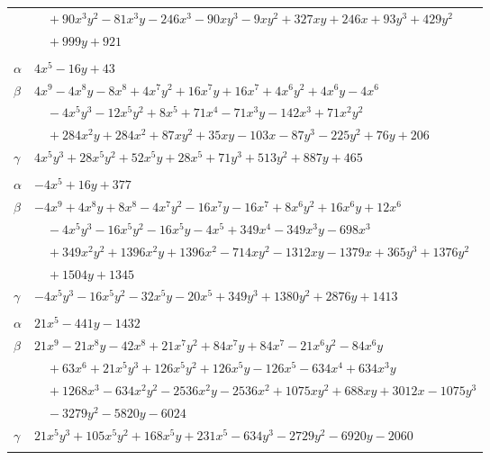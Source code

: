 \documentclass[11pt]{article}
\begin{document}
\begin{longtable}{@{}ll@{}}
 & $\quad +90x^{3}y^{2}-81x^{3}y-246x^{3}-90xy^{3}-9xy^{2}+327xy+246x+93y^{3}+429y^{2}$\\
 & $\quad +999y+921$\\
\addlinespace[3pt]
\multicolumn{2}{@{}l}{$\{i,j\}=\{14,24\}$, $k_{ij}=3^{2}\cdot 5^{2}$}\\
$\alpha$ & $4x^{5}-16y+43$\\
$\beta$ & $4x^{9}-4x^{8}y-8x^{8}+4x^{7}y^{2}+16x^{7}y+16x^{7}+4x^{6}y^{2}+4x^{6}y-4x^{6}$\\
 & $\quad -4x^{5}y^{3}-12x^{5}y^{2}+8x^{5}+71x^{4}-71x^{3}y-142x^{3}+71x^{2}y^{2}$\\
 & $\quad +284x^{2}y+284x^{2}+87xy^{2}+35xy-103x-87y^{3}-225y^{2}+76y+206$\\
$\gamma$ & $4x^{5}y^{3}+28x^{5}y^{2}+52x^{5}y+28x^{5}+71y^{3}+513y^{2}+887y+465$\\
\addlinespace[3pt]
\multicolumn{2}{@{}l}{$\{i,j\}=\{14,26\}$, $k_{ij}=3\cdot 7\cdot 11$}\\
$\alpha$ & $-4x^{5}+16y+377$\\
$\beta$ & $-4x^{9}+4x^{8}y+8x^{8}-4x^{7}y^{2}-16x^{7}y-16x^{7}+8x^{6}y^{2}+16x^{6}y+12x^{6}$\\
 & $\quad -4x^{5}y^{3}-16x^{5}y^{2}-16x^{5}y-4x^{5}+349x^{4}-349x^{3}y-698x^{3}$\\
 & $\quad +349x^{2}y^{2}+1396x^{2}y+1396x^{2}-714xy^{2}-1312xy-1379x+365y^{3}+1376y^{2}$\\
 & $\quad +1504y+1345$\\
$\gamma$ & $-4x^{5}y^{3}-16x^{5}y^{2}-32x^{5}y-20x^{5}+349y^{3}+1380y^{2}+2876y+1413$\\
\addlinespace[3pt]
\multicolumn{2}{@{}l}{$\{i,j\}=\{14,28\}$, $k_{ij}=2^{3}\cdot 5^{2}\cdot 11$}\\
$\alpha$ & $21x^{5}-441y-1432$\\
$\beta$ & $21x^{9}-21x^{8}y-42x^{8}+21x^{7}y^{2}+84x^{7}y+84x^{7}-21x^{6}y^{2}-84x^{6}y$\\
 & $\quad +63x^{6}+21x^{5}y^{3}+126x^{5}y^{2}+126x^{5}y-126x^{5}-634x^{4}+634x^{3}y$\\
 & $\quad +1268x^{3}-634x^{2}y^{2}-2536x^{2}y-2536x^{2}+1075xy^{2}+688xy+3012x-1075y^{3}$\\
 & $\quad -3279y^{2}-5820y-6024$\\
$\gamma$ & $21x^{5}y^{3}+105x^{5}y^{2}+168x^{5}y+231x^{5}-634y^{3}-2729y^{2}-6920y-2060$\\
\addlinespace[3pt]
\multicolumn{2}{@{}l}{$\{i,j\}=\{15,16\}$, $k_{ij}=2^{3}\cdot 3^{2}$}\\

\end{longtable}
\end{document}
